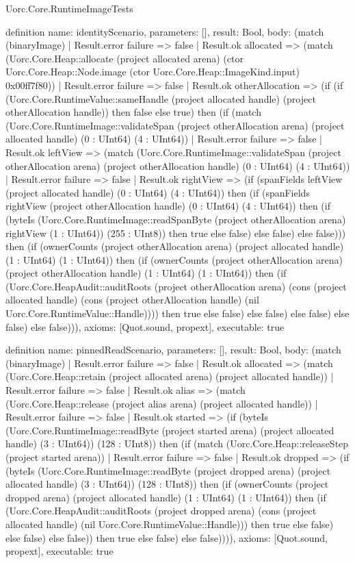 \begin{lexlean}{Uorc.Core.RuntimeImageTests}
\begin{semanticmodule}
definition{
  name: identityScenario,
  parameters: [],
  result: Bool,
  body: (match (binaryImage)
    | Result.error failure => false
    | Result.ok allocated => (match (Uorc.Core.Heap::allocate (project allocated arena) (ctor Uorc.Core.Heap::Node.image (ctor Uorc.Core.Heap::ImageKind.input) 0x00ff7f80))
      | Result.error failure => false
      | Result.ok otherAllocation => (if (if (Uorc.Core.RuntimeValue::sameHandle (project allocated handle) (project otherAllocation handle)) then false else true) then (if (match (Uorc.Core.RuntimeImage::validateSpan (project otherAllocation arena) (project allocated handle) (0 : UInt64) (4 : UInt64))
        | Result.error failure => false
        | Result.ok leftView => (match (Uorc.Core.RuntimeImage::validateSpan (project otherAllocation arena) (project otherAllocation handle) (0 : UInt64) (4 : UInt64))
          | Result.error failure => false
          | Result.ok rightView => (if (spanFields leftView (project allocated handle) (0 : UInt64) (4 : UInt64)) then (if (spanFields rightView (project otherAllocation handle) (0 : UInt64) (4 : UInt64)) then (if (byteIs (Uorc.Core.RuntimeImage::readSpanByte (project otherAllocation arena) rightView (1 : UInt64)) (255 : UInt8)) then true else false) else false) else false))) then (if (ownerCounts (project otherAllocation arena) (project allocated handle) (1 : UInt64) (1 : UInt64)) then (if (ownerCounts (project otherAllocation arena) (project otherAllocation handle) (1 : UInt64) (1 : UInt64)) then (if (Uorc.Core.HeapAudit::auditRoots (project otherAllocation arena) (cons (project allocated handle) (cons (project otherAllocation handle) (nil Uorc.Core.RuntimeValue::Handle)))) then true else false) else false) else false) else false) else false))),
  axioms: [Quot.sound, propext],
  executable: true
}

definition{
  name: pinnedReadScenario,
  parameters: [],
  result: Bool,
  body: (match (binaryImage)
    | Result.error failure => false
    | Result.ok allocated => (match (Uorc.Core.Heap::retain (project allocated arena) (project allocated handle))
      | Result.error failure => false
      | Result.ok alias => (match (Uorc.Core.Heap::release (project alias arena) (project allocated handle))
        | Result.error failure => false
        | Result.ok started => (if (byteIs (Uorc.Core.RuntimeImage::readByte (project started arena) (project allocated handle) (3 : UInt64)) (128 : UInt8)) then (if (match (Uorc.Core.Heap::releaseStep (project started arena))
          | Result.error failure => false
          | Result.ok dropped => (if (byteIs (Uorc.Core.RuntimeImage::readByte (project dropped arena) (project allocated handle) (3 : UInt64)) (128 : UInt8)) then (if (ownerCounts (project dropped arena) (project allocated handle) (1 : UInt64) (1 : UInt64)) then (if (Uorc.Core.HeapAudit::auditRoots (project dropped arena) (cons (project allocated handle) (nil Uorc.Core.RuntimeValue::Handle))) then true else false) else false) else false)) then true else false) else false)))),
  axioms: [Quot.sound, propext],
  executable: true
}


\end{semanticmodule}
\end{lexlean}
